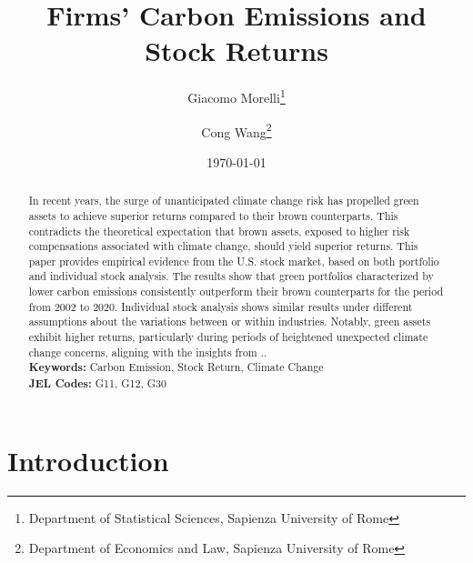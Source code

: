 \documentclass[12pt]{article}
\begin{document}
\begin{titlepage}
\title{Firms' Carbon Emissions and Stock Returns}
\author{Giacomo Morelli\thanks{Department of Statistical Sciences, Sapienza University of Rome} \and 
Cong Wang\thanks{Department of Economics and Law, Sapienza University of Rome}}
\date{\today}
\maketitle
\begin{abstract}
\noindent In recent years, the surge of unanticipated climate change risk has propelled green assets to achieve superior returns compared to their brown counterparts. This contradicts the theoretical expectation that brown assets, exposed to higher risk compensations associated with climate change, should yield superior returns. This paper provides empirical evidence from the U.S. stock market, based on both portfolio and individual stock analysis. The results show that green portfolios characterized by lower carbon emissions consistently outperform their brown counterparts for the period from 2002 to 2020. Individual stock analysis shows similar results under different assumptions about the variations between or within industries. Notably, green assets exhibit higher returns, particularly during periods of heightened unexpected climate change concerns, aligning with the insights from \cite{ardia2022climate}..\\

\noindent\textbf{Keywords:} Carbon Emission, Stock Return, Climate Change\\

\noindent\textbf{JEL Codes:} G11, G12, G30\\
\bigskip
\end{abstract}
\setcounter{page}{0}
\thispagestyle{empty}
\end{titlepage}
\pagebreak \newpage

\doublespacing

\section{Introduction} \label{sec:introduction}
\end{document}
